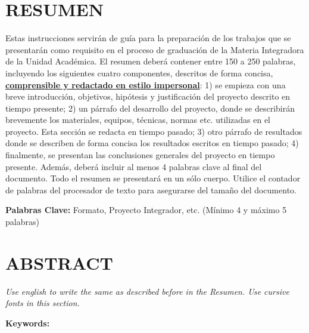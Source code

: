 \chapter{RESUMEN}

Estas instrucciones servir\'an de guía para la preparaci\'on de los trabajos que se presentar\'an como requisito en el proceso de graduaci\'on de la Materia Integradora de la Unidad Acad\'emica. El resumen deber\'a contener entre 150 a 250 palabras, incluyendo los siguientes cuatro componentes, descritos de forma concisa, \textbf{ \underline{comprensible y redactado en estilo impersonal}}: 1) se empieza con una breve introducci\'on, objetivos, hip\'otesis y justificaci\'on del proyecto descrito en tiempo presente; 2) un p\'arrafo del desarrollo del proyecto, donde se describir\'an brevemente los materiales, equipos, t\'ecnicas, normas etc. utilizadas en el proyecto\cite{6469518}. Esta secci\'on se redacta en tiempo pasado; 3) otro p\'arrafo de resultados donde se describen de forma concisa los resultados escritos en tiempo pasado; 4) finalmente, se presentan las conclusiones generales del proyecto en tiempo presente. Adem\'as, deber\'a incluir al menos 4 palabras clave al final del documento. Todo el resumen se presentar\'a en un s\'olo cuerpo. Utilice el contador de palabras del procesador de texto para asegurarse del tamaño del documento. 

\textbf{Palabras Clave:} Formato, Proyecto Integrador, etc. (M\'inimo 4 y m\'aximo 5 palabras)



\chapter{ABSTRACT}

\textit{Use english to write the same as described before in the Resumen. Use cursive fonts in this section.}

\textbf{Keywords:} 

